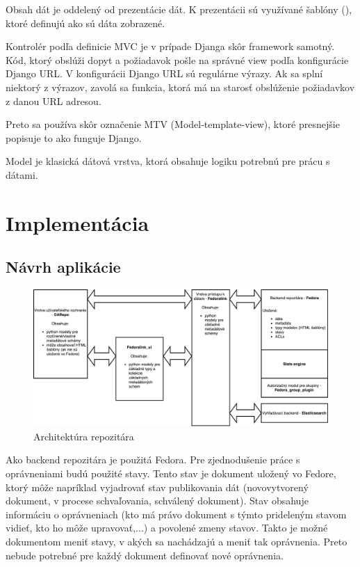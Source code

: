\documentclass[thesis=M,slovak]{FITthesis}[2013/05/06]
\begin{document}
Obsah dát je oddelený od prezentácie dát. K prezentácii sú využívané šablóny (), ktoré definujú ako sú dáta zobrazené.

Kontrolér podľa definicie MVC je v prípade Djanga skôr framework samotný. Kód, ktorý obslúži dopyt a požiadavok pošle na správné view podľa konfigurácie Django URL. V konfigurácii Django URL sú regulárne výrazy. Ak sa splní niektorý z výrazov, zavolá sa funkcia, ktorá má na starosť obslúženie požiadavkov z danou URL adresou.

Preto sa používa skôr označenie MTV (Model-template-view), ktoré presnejšie popisuje to ako funguje Django. \cite{DjangoFAQ}

Model je klasická dátová vrstva, ktorá obsahuje logiku potrebnú pre prácu s dátami.

\chapter{Implementácia}
\section{Návrh aplikácie}
\begin{figure}\centering
	\includegraphics[width=1.0\textwidth]{diagramy/Architektura_repozitara.pdf}
 	\caption[Architektúra repozitára]{Architektúra repozitára}\label{graphics:architektura_repozitara}
\end{figure}

Ako backend repozitára je použitá Fedora. Pre zjednodušenie práce s oprávneniami budú použité stavy. Tento stav je dokument uložený vo Fedore, ktorý môže napríklad vyjadrovať stav publikovania dát (novovytvorený dokument, v procese schvaľovania, schválený dokument). Stav obsahuje informáciu o oprávneniach (kto má právo dokument s týmto prideleným stavom vidieť, kto ho môže upravovať,...) a povolené zmeny stavov. Takto je možné dokumentom meniť stavy, v akých sa nachádzajú a meniť tak oprávnenia. Preto nebude potrebné pre každý dokument definovať nové oprávnenia.
\end{document}
